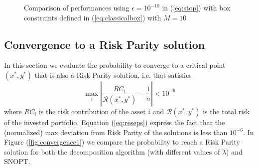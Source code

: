 \begin{figure}
{{
}
}
\caption{Comparison of performances using $\epsilon = 10^{-10}$ in (\ref{eq:stop}) with box constraints defined in (\ref{eq:classicalbox}) with $M=10$}
\label{fig:10}
\end{figure}

\subsection{Convergence to a Risk Parity solution}
In this section we evaluate the probability to converge to a critical point $(x^*,y^*)$ that is also a Risk Parity solution, i.e. that satisfies 
\begin{equation}\label{eq:reseps}
\max_i \left| \frac{RC_i}{\mathcal{R}(x^*,y^*)} - \frac{1}{n} \right| < 10^{-6}
\end{equation}
where $RC_i$ is the risk contribution of the asset $i$ and ${\mathcal{R}(x^*,y^*)}$ is the total risk of the invested portfolio. Equation (\ref{eq:reseps}) express the fact that the (normalized) max deviation from Risk Parity of the solutions is less than $10^{-6}$. In Figure (\ref{fig:convergence1}) we compare the probability to reach a Risk Parity solution for both the decomposition algorithm (with different values of $\lambda$) and SNOPT. 

